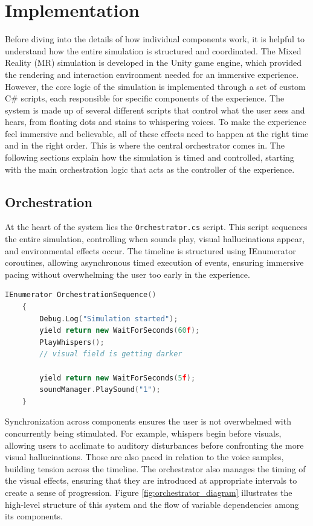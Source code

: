 \chapter{Implementation}
\label{ch:implementation}

Before diving into the details of how individual components work, it is helpful to understand how the entire simulation is structured and coordinated. The Mixed Reality (MR) simulation is developed in the Unity game engine, which provided the rendering and interaction environment needed for an immersive experience. However, the core logic of the simulation is implemented through a set of custom C\# scripts, each responsible for specific components of the experience. The system is made up of several different scripts that control what the user sees and hears, from floating dots and stains to whispering voices. To make the experience feel immersive and believable, all of these effects need to happen at the right time and in the right order. This is where the central orchestrator comes in. The following sections explain how the simulation is timed and controlled, starting with the main orchestration logic that acts as the controller of the experience.

\section{Orchestration}
At the heart of the system lies the \texttt{Orchestrator.cs} script. This script sequences the entire simulation, controlling when sounds play, visual hallucinations appear, and environmental effects occur. The timeline is structured using IEnumerator coroutines, allowing asynchronous timed execution of events, ensuring immersive pacing without overwhelming the user too early in the experience.

\begin{lstlisting}[language=C++, caption={Orchestration Coroutine}, label={lst:orchestration}]
    IEnumerator OrchestrationSequence()
    {
        Debug.Log("Simulation started");
        yield return new WaitForSeconds(60f);
        PlayWhispers();
        // visual field is getting darker
    
        yield return new WaitForSeconds(5f);
        soundManager.PlaySound("1");
    }
    \end{lstlisting}
    

Synchronization across components ensures the user is not overwhelmed with concurrently being stimulated. For example, whispers begin before visuals, allowing users to acclimate to auditory disturbances before confronting the more visual hallucinations. Those are also paced in relation to the voice samples, building tension across the timeline.
The orchestrator also manages the timing of the visual effects, ensuring that they are introduced at appropriate intervals to create a sense of progression. Figure \ref{fig:orchestrator_diagram} illustrates the high-level structure of this system and the flow of variable dependencies among its components.

